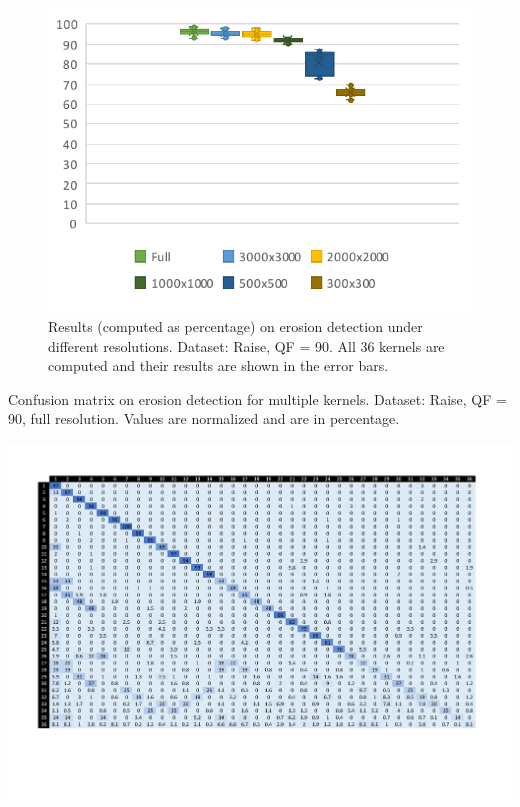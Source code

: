 \documentclass[review]{elsarticle}
\begin{document}
\begin{figure}[h!]
	\centering
	\includegraphics[width=0.7\linewidth]{resolutions.pdf}
	\caption{Results (computed as percentage) on erosion detection under different resolutions. Dataset: Raise, QF = 90. All 36 kernels are computed and their results are shown in the error bars.}
	\label{fig:resolutions}
\end{figure}

\begin{table}
	\centering
	\caption{Confusion matrix on erosion detection for multiple kernels. Dataset: Raise, QF = 90, full resolution. Values are normalized and are in percentage.}
	\label{table:confusion}
	\includegraphics[width=\linewidth]{confusion}
\end{table}
\end{document}
